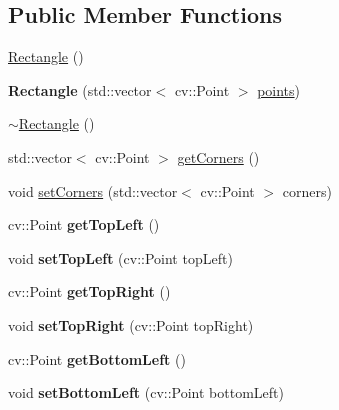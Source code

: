 \subsection*{Public Member Functions}
\begin{DoxyCompactItemize}
\item 
\mbox{\hyperlink{class_rectangle_a8a933e0ebd9e80ce91e61ffe87fd577e}{Rectangle}} ()
\item 
\mbox{\label{class_rectangle_a98bb642b8f2ebe0e33b4de980ecb42fa}} 
{\bfseries Rectangle} (std\+::vector$<$ cv\+::\+Point $>$ \mbox{\hyperlink{class_polygon_a347474823f6113a34fdefeee276d1b9e}{points}})
\item 
\mbox{\hyperlink{class_rectangle_a494c076b13aadf26efdce07d23c61ddd}{$\sim$\+Rectangle}} ()
\item 
std\+::vector$<$ cv\+::\+Point $>$ \mbox{\hyperlink{class_rectangle_ae250a28affce22b4a363d1a0213df9fa}{get\+Corners}} ()
\item 
void \mbox{\hyperlink{class_rectangle_abd4c59ad5fa7010563f2efb95c553b24}{set\+Corners}} (std\+::vector$<$ cv\+::\+Point $>$ corners)
\item 
\mbox{\label{class_rectangle_a679fadb201becac2a2eb45a689426ab0}} 
cv\+::\+Point {\bfseries get\+Top\+Left} ()
\item 
\mbox{\label{class_rectangle_a2e4b7aa32ed159fe44e580d6add40e26}} 
void {\bfseries set\+Top\+Left} (cv\+::\+Point top\+Left)
\item 
\mbox{\label{class_rectangle_a2591c940d45e3449f63f95eb13c0aba1}} 
cv\+::\+Point {\bfseries get\+Top\+Right} ()
\item 
\mbox{\label{class_rectangle_a529ad55b3f154a231b6aad0162d8430f}} 
void {\bfseries set\+Top\+Right} (cv\+::\+Point top\+Right)
\item 
\mbox{\label{class_rectangle_a33b9ffde2e54e9577cb369a59e965adc}} 
cv\+::\+Point {\bfseries get\+Bottom\+Left} ()
\item 
\mbox{\label{class_rectangle_ab393bd8f13ec5b90ed02f8d246f03ec0}} 
void {\bfseries set\+Bottom\+Left} (cv\+::\+Point bottom\+Left)
\item 

\end{DoxyCompactItemize}
